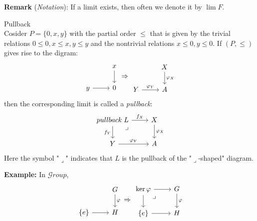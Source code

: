 \noindent\textbf{Remark} (\textit{Notation}): If a limit exists, then often we denote it by $\lim F$.

\begin{definition}{Pullback}\\
Cosider $P= \{0,x,y\}$ with the partial order $\leq$ that is given by the trivial relations $0\leq 0, x\leq x, y\leq y$ and the nontrivial relations $x \leq 0, y\leq 0$. If $(P,\leq)$ gives rise to the digram:
$$\begin{tikzcd}
    &x \arrow[d]\\
    y \arrow[r] &0
\end{tikzcd} \Rightarrow
\begin{tikzcd}
    &X \arrow[d, "\varphi_X"]\\
    Y \arrow[r, "\varphi_Y"] &A
\end{tikzcd}$$
then the corresponding limit is called a \textit{pullback}:
$$\begin{tikzcd}
    {pullback}\;L \arrow[r, "f_X"] \arrow[d, "f_Y"'] \arrow[dr, phantom, "\lrcorner", pos=0.15] &X \arrow[d, "\varphi_X"] \\
    Y \arrow[r, "\varphi_Y"] &A
\end{tikzcd}$$
Here the symbol "$\lrcorner$" indicates that $L$ is the pullback of the "$\lrcorner$-shaped" diagram.
\end{definition}

\noindent\textbf{Example:} In $\mathcal{G}roup$,
$$\begin{tikzcd}
    &G \arrow[d, "\varphi"]\\
    \{e\} \arrow[r] &H
\end{tikzcd} \Rightarrow \begin{tikzcd}
    \ker \varphi \arrow[r] \arrow[d] \arrow[dr, phantom, "\lrcorner", pos=0.15] &G \arrow[d, "\varphi"]\\
    \{e\} \arrow[r] &H
\end{tikzcd}$$

